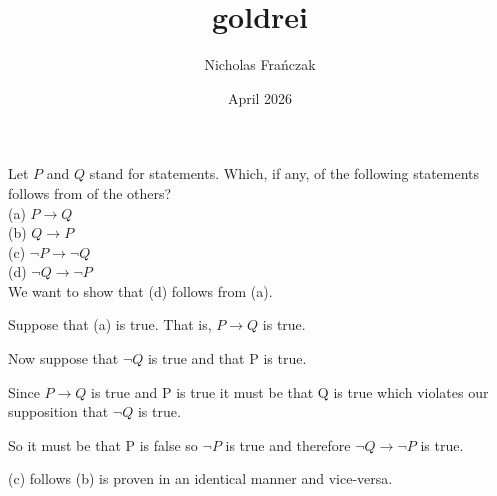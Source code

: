 \documentclass{article}
\title{goldrei}
\author{Nicholas Frańczak}
\date{April 2026}
\begin{document}
\noindent Let $P$ and $Q$ stand for statements. Which, if any, of the following statements follows from of the others?\\
(a) $ P \rightarrow Q$\\
(b) $ Q \rightarrow P$\\
(c) $ \neg P \rightarrow \neg Q$\\
(d) $ \neg Q \rightarrow \neg P$\\

We want to show that (d) follows from (a).

Suppose that (a) is true. That is, $ P \rightarrow Q$ is true.

Now suppose that $\neg Q$ is true and that P is true.

Since $ P \rightarrow Q$ is true and P is true it must be that Q is true which violates our supposition that $\neg Q$ is true.

So it must be that P is false so $\neg P$ is true and therefore $ \neg Q \rightarrow \neg P$ is true.

(c) follows (b) is proven in an identical manner and vice-versa.
\end{document}
